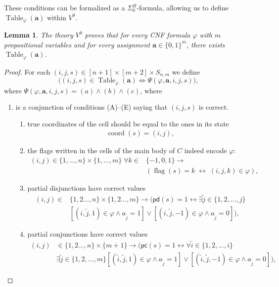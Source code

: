 \documentclass{article}
\theoremstyle{plain}
\newtheorem{lemma}[theorem]{Lemma}
\theoremstyle{definition}
\DeclareMathOperator{\Table}{Table}
\DeclareMathOperator{\flag}{flag}
\DeclareMathOperator{\coord}{coord}
\newcommand{\pc}{\mathsf{pc}}
\newcommand{\pd}{\mathsf{pd}}
\newcommand{\tuple}{\mathbf}
\begin{document}
These conditions can be formalized as a $\Sigma^B_0$-formula, 
allowing us to define $\Table_\varphi(\tuple a)$ within $V^0$.


\begin{lemma}\label{lm:V_0_table}
The theory $V^0$ proves that for every CNF formula $\varphi$ with $m$ propositional variables and for every assignment $\tuple a \in \{0,1\}^m$, there exists $\Table_\varphi(\tuple a)$.
\end{lemma}
\begin{proof}
    
For each $(i,j,s) \in [n+1] \times [m+2] \times S_{n,m}$ we define
\[
 \bigl((i, j, s) \in \Table_\varphi(\tuple a) \iff \Psi(\varphi, \tuple a, i,j, s) \bigr),
\]
where $\Psi(\varphi, \tuple a, i,j, s) = (a) \wedge (b) \wedge (c)$, where
\begin{enumerate}[label=(\alph*)]

\item is a conjunction of conditions (A)--(E) saying that $(i, j, s)$ is correct.
\begin{enumerate}[label=(\Alph*)]
    \item true coordinates of the cell should be equal to the ones in its state
    \begin{align*}
    \coord(s)=(i,j),        
    \end{align*}

    \item the flags written in the cells of the main body of $C$ indeed encode $\varphi$:
    \begin{align*}
    (i,j) \in \{1,\dots,n\} \times \{1,\dots,m\}\; \forall k \in&\{-1, 0, 1\} 
     \rightarrow \\& 
    (\flag(s)=k \;\leftrightarrow\; (i,j,k)\in\varphi),
    \end{align*}
    
    \item partial disjunctions have correct values
    \begin{align*}
    (i,j) \in & \{1,2 \dots, n\} \times \{1, 2 \dots, m\} \rightarrow \bigr(\pd(s) =1 \leftrightarrow \exists \tilde{j}\in\{1, 2, \dots, j\} \\& [(i, \tilde{j}, 1) \in \varphi \wedge a_{\tilde{j}}=1] \vee [(i, \tilde{j}, -1) \in \varphi \wedge a_{\tilde{j}}=0] \bigl),        
    \end{align*}

        \item partial conjunctions have correct values
    \begin{align*}
    (i,j) & \in \{1,2 \dots, n\} \times \{m+1\} \rightarrow   \bigr(\pc(s) =1 \leftrightarrow \forall \tilde{i} \in \{1, 2, \dots, i\} \; \\& \exists \tilde{j}\in\{1, 2, \dots, m\}  [(\tilde{i}, \tilde{j}, 1) \in \varphi \wedge a_{\tilde{j}}=1] \vee [(\tilde{i}, \tilde{j}, -1) \in \varphi \wedge a_{\tilde{j}}=0]\bigl),        
    \end{align*}


\end{enumerate}
\end{enumerate}
\end{proof}
\end{document}
